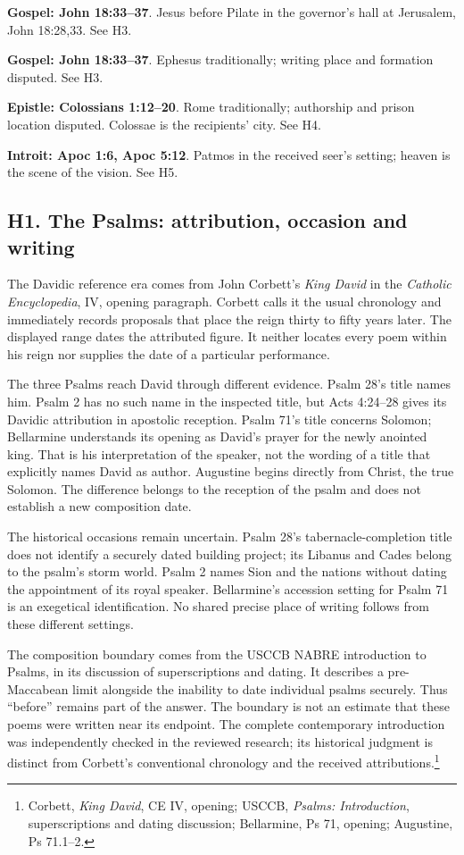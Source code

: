 \noindent\textbf{Gospel: John 18:33--37}. Jesus before Pilate in the governor's hall at Jerusalem, John 18:28,33. See H3.

\noindent\textbf{Gospel: John 18:33--37}. Ephesus traditionally; writing place and formation disputed. See H3.

\noindent\textbf{Epistle: Colossians 1:12--20}. Rome traditionally; authorship and prison location disputed. Colossae is the recipients' city. See H4.

\noindent\textbf{Introit: Apoc 1:6, Apoc 5:12}. Patmos in the received seer's setting; heaven is the scene of the vision. See H5.


\subsection{H1. The Psalms: attribution, occasion and writing}
\label{history-psalms}
The Davidic reference era comes from John Corbett's \emph{King David} in the \emph{Catholic Encyclopedia}, IV, opening paragraph. Corbett calls it the usual chronology and immediately records proposals that place the reign thirty to fifty years later. The displayed range dates the attributed figure. It neither locates every poem within his reign nor supplies the date of a particular performance.

The three Psalms reach David through different evidence. Psalm 28's title names him. Psalm 2 has no such name in the inspected title, but Acts 4:24--28 gives its Davidic attribution in apostolic reception. Psalm 71's title concerns Solomon; Bellarmine understands its opening as David's prayer for the newly anointed king. That is his interpretation of the speaker, not the wording of a title that explicitly names David as author. Augustine begins directly from Christ, the true Solomon. The difference belongs to the reception of the psalm and does not establish a new composition date.

The historical occasions remain uncertain. Psalm 28's tabernacle-completion title does not identify a securely dated building project; its Libanus and Cades belong to the psalm's storm world. Psalm 2 names Sion and the nations without dating the appointment of its royal speaker. Bellarmine's accession setting for Psalm 71 is an exegetical identification. No shared precise place of writing follows from these different settings.

The composition boundary comes from the USCCB NABRE introduction to Psalms, in its discussion of superscriptions and dating. It describes a pre-Maccabean limit alongside the inability to date individual psalms securely. Thus ``before'' remains part of the answer. The boundary is not an estimate that these poems were written near its endpoint. The complete contemporary introduction was independently checked in the reviewed research; its historical judgment is distinct from Corbett's conventional chronology and the received attributions.\footnote{Corbett, \emph{King David}, CE IV, opening; USCCB, \emph{Psalms: Introduction}, superscriptions and dating discussion; Bellarmine, Ps 71, opening; Augustine, Ps 71.1--2.}

